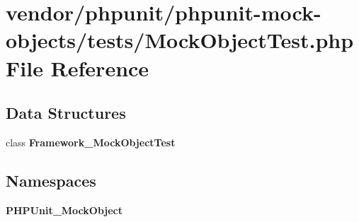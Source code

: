 \section{vendor/phpunit/phpunit-\/mock-\/objects/tests/\+Mock\+Object\+Test.php File Reference}
\label{_mock_object_test_8php}
\subsection*{Data Structures}
\begin{DoxyCompactItemize}
\item 
class {\bf Framework\+\_\+\+Mock\+Object\+Test}
\end{DoxyCompactItemize}
\subsection*{Namespaces}
\begin{DoxyCompactItemize}
\item 
 {\bf P\+H\+P\+Unit\+\_\+\+Mock\+Object}
\end{DoxyCompactItemize}
